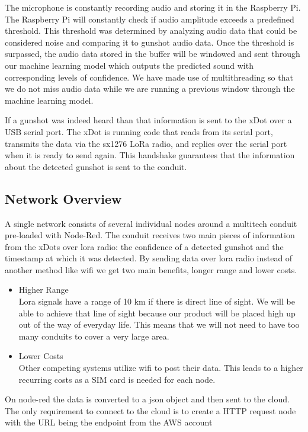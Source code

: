 \documentclass[conference]{IEEEtran}
\begin{document}
The microphone is constantly recording audio and storing it in the Raspberry Pi. The Raspberry Pi will constantly check if audio amplitude exceeds a predefined threshold. This threshold was determined by analyzing audio data that could be considered noise and comparing it to gunshot audio data. 
Once the threshold is surpassed, the audio data stored in the buffer will be windowed and sent through our machine learning model which outputs the predicted sound with corresponding levels of confidence. We have made use of multithreading so that we do not miss audio data while we are running a previous window through the machine learning model.

If a gunshot was indeed heard than that information is sent to the xDot over a USB serial port. The xDot is running code that reads from its serial port, transmits the data via the sx1276 LoRa radio, and replies over the serial port when it is ready to send again. This handshake guarantees that the information about the detected gunshot is sent to the conduit.


\subsection{Network Overview}
A single network consists of several individual nodes around a multitech conduit pre-loaded with Node-Red. The conduit receives two main pieces of information from the xDots over lora radio: the confidence of a detected gunshot and the timestamp at which it was detected. By sending data over lora radio instead of another method like wifi we get two main benefits, longer range and lower costs.

 
\begin{itemize}
\item Higher Range\\  Lora signals have a range of 10 km if there is direct line of sight. 
We will be able to achieve that line of sight because our product will be placed high up out of the way of everyday life. This means that we will not need to have too many conduits to cover a very large area. 
\item Lower Costs \\ Other competing systems utilize wifi to post their data. This leads to a higher recurring costs as a SIM card is needed for each node.

\end{itemize}

On node-red the data is converted to a json object and then sent to the cloud. The only requirement to connect to the cloud is to create a HTTP request node with the URL being the endpoint from the AWS account
\end{document}
